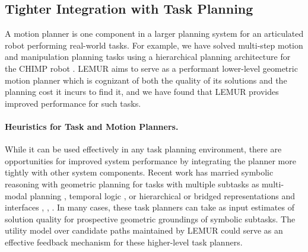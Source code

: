 %
%
%

\subsection{Tighter Integration with Task Planning}

A motion planner is one component in a larger planning system for
an articulated robot performing real-world tasks.
For example,
we have solved multi-step motion and manipulation planning tasks
using a hierarchical planning architecture for the CHIMP robot
\citep{dellin2014drc}.
LEMUR aims to serve as a performant lower-level geometric motion
planner which is cognizant of both the quality of its solutions
and the planning cost it incurs to find it,
and we have found that LEMUR provides improved performance for
such tasks.

\paragraph{Heuristics for Task and Motion Planners.}
While it can be used effectively in any task planning environment,
there are  opportunities for improved system performance by
integrating the planner more tightly with other system components.
Recent work has married symbolic reasoning with geometric planning
for tasks with multiple subtasks
as multi-modal planning \citep{hauser2010multi},
temporal logic \citep{bhatia2010temporalgoals},
or hierarchical or bridged representations and interfaces
\citep{cambon2009hybrid}, \citep{gravot2005asymov},
\citep{srivastava2014taskmotion}.
In many cases, these task planners can take as input estimates
of solution quality
for prospective geometric groundings of symbolic subtasks.
The utility model over candidate paths maintained by LEMUR could
serve as an effective feedback mechanism for these higher-level
task planners.

